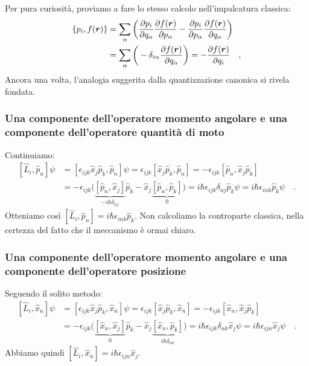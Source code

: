 Per pura curiosità, proviamo a fare lo stesso calcolo nell'impalcatura classica:
\[
\begin{aligned}
    \{p_i, f(\bm{r})\} &= \sum_\alpha \left( \pdv{p_i}{q_\alpha}\pdv{f(\bm{r})}{p_\alpha} - \pdv{p_i}{p_\alpha}\pdv{f(\bm{r})}{q_\alpha} \right) \\
    &= \sum_\alpha \bigg(-\delta_{i\alpha}\pdv{f(\bm{r})}{q_\alpha}\bigg) = - \pdv{f(\bm{r})}{q_i} \quad,
\end{aligned}
\]
Ancora una volta, l'analogia suggerita dalla quantizzazione canonica si rivela fondata.

\subsubsection{Una componente dell'operatore momento angolare e una componente dell'operatore quantità di moto}
Continuiamo: 
\[
\begin{aligned}
    [\hat{L}_i, \hat{p}_n]\psi &= [\epsilon_{ijk}\hat{x}_j\hat{p}_k, \hat{p}_n]\psi = \epsilon_{ijk}[\hat{x}_j\hat{p}_k, \hat{p}_n] = - \epsilon_{ijk}[\hat{p}_n,\hat{x}_j\hat{p}_k]\\
    &= - \epsilon_{ijk} \big( \underbrace{[\hat{p}_n,\hat{x}_j]}_{-i\hbar \delta_{nj}}\hat{p}_k - \hat{x}_j \underbrace{[\hat{p}_n,\hat{p}_k]}_{0} \big) = i\hbar\epsilon_{ijk} \delta_{nj}\hat{p}_k \psi = i\hbar\epsilon_{ink} \hat{p}_k\psi \quad.
\end{aligned}
\]
Otteniamo così $[\hat{L}_i, \hat{p}_n] = i\hbar\epsilon_{ink}\hat{p}_k$. Non calcoliamo la controparte classica, nella certezza del fatto che il meccanismo è ormai chiaro.


\subsubsection{Una componente dell'operatore momento angolare e una componente dell'operatore posizione}
Seguendo il solito metodo:
\[
\begin{aligned}
    [\hat{L}_i, \hat{x}_n]\psi &= [\epsilon_{ijk}\hat{x}_j\hat{p}_k, \hat{x}_n]\psi = \epsilon_{ijk}[\hat{x}_j\hat{p}_k, \hat{x}_n] = - \epsilon_{ijk}[\hat{x}_n,\hat{x}_j\hat{p}_k]\\
    &= - \epsilon_{ijk} \big( \underbrace{[\hat{x}_n,\hat{x}_j]}_{0}\hat{p}_k - \hat{x}_j \underbrace{[\hat{x}_n,\hat{p}_k]}_{i\hbar \delta_{nk}} \big) = i\hbar\epsilon_{ijk} \delta_{nk}\hat{x}_j \psi = i\hbar\epsilon_{ijn}\hat{x}_j\psi \quad.
\end{aligned}
\]
Abbiamo quindi $[\hat{L}_i, \hat{x}_n] = i\hbar\epsilon_{ijn}\hat{x}_j$.

